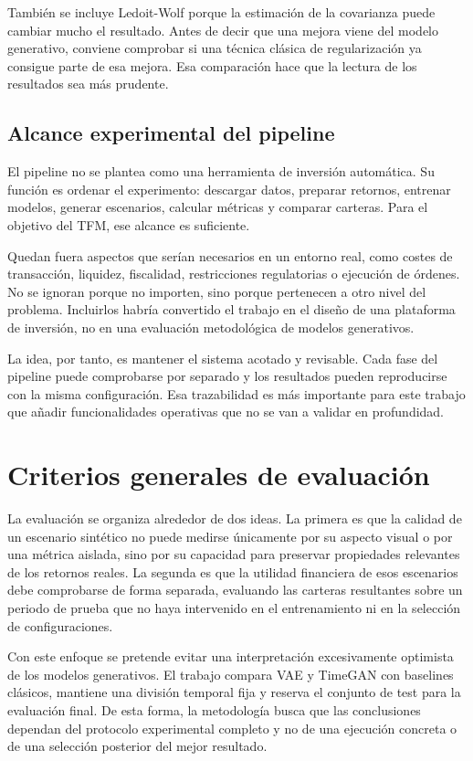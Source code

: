 \documentclass[11pt,a4paper,spanish,oneside]{book}
\numberwithin{equation}{chapter}
\numberwithin{figure}{chapter}
\begin{document}
También se incluye Ledoit-Wolf porque la estimación de la covarianza puede cambiar mucho el resultado. Antes de decir que una mejora viene del modelo generativo, conviene comprobar si una técnica clásica de regularización ya consigue parte de esa mejora. Esa comparación hace que la lectura de los resultados sea más prudente.

\subsection{Alcance experimental del pipeline}

El pipeline no se plantea como una herramienta de inversión automática. Su función es ordenar el experimento: descargar datos, preparar retornos, entrenar modelos, generar escenarios, calcular métricas y comparar carteras. Para el objetivo del TFM, ese alcance es suficiente.

Quedan fuera aspectos que serían necesarios en un entorno real, como costes de transacción, liquidez, fiscalidad, restricciones regulatorias o ejecución de órdenes. No se ignoran porque no importen, sino porque pertenecen a otro nivel del problema. Incluirlos habría convertido el trabajo en el diseño de una plataforma de inversión, no en una evaluación metodológica de modelos generativos.

La idea, por tanto, es mantener el sistema acotado y revisable. Cada fase del pipeline puede comprobarse por separado y los resultados pueden reproducirse con la misma configuración. Esa trazabilidad es más importante para este trabajo que añadir funcionalidades operativas que no se van a validar en profundidad.

\section{Criterios generales de evaluación}

La evaluación se organiza alrededor de dos ideas. La primera es que la calidad de un escenario sintético no puede medirse únicamente por su aspecto visual o por una métrica aislada, sino por su capacidad para preservar propiedades relevantes de los retornos reales. La segunda es que la utilidad financiera de esos escenarios debe comprobarse de forma separada, evaluando las carteras resultantes sobre un periodo de prueba que no haya intervenido en el entrenamiento ni en la selección de configuraciones.

Con este enfoque se pretende evitar una interpretación excesivamente optimista de los modelos generativos. El trabajo compara VAE y TimeGAN con baselines clásicos, mantiene una división temporal fija y reserva el conjunto de test para la evaluación final. De esta forma, la metodología busca que las conclusiones dependan del protocolo experimental completo y no de una ejecución concreta o de una selección posterior del mejor resultado.
\end{document}

